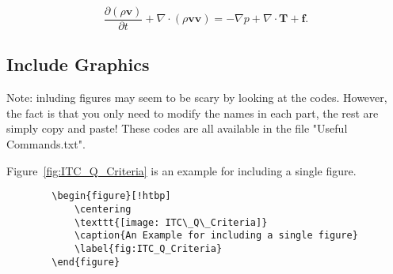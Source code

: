 \begin{equation}\label{eq:N-S_equation}
    \frac{\partial (\rho\mathbf{v})}{\partial t} + \nabla \cdot (\rho \mathbf{v} \mathbf{v}) = -\nabla p + \nabla \cdot\mathbf{T} + \mathbf{f}. 
\end{equation}    

\subsection{Include Graphics} %
Note: inluding figures may seem to be scary by looking at the codes. However, the fact is that you only need to modify the names in each part, the rest are simply copy and paste! These codes are all available in the file "Useful Commands.txt".

Figure~\ref{fig:ITC_Q_Criteria} is an example for including a single figure.
\begin{center}
    \small
    \begin{verbatim}
        \begin{figure}[!htbp]
            \centering
            \texttt{[image: ITC\_Q\_Criteria]}
            \caption{An Example for including a single figure}
            \label{fig:ITC_Q_Criteria}
        \end{figure}
    \end{verbatim}
\end{center}

